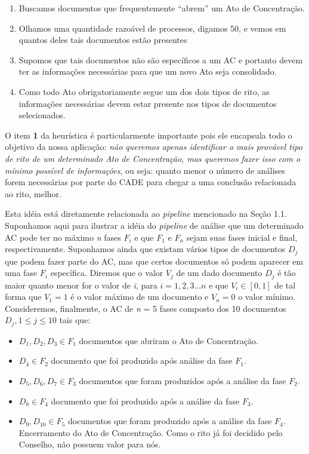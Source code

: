\documentclass[11pt]{report}
\newcommand{\quotes}[1]{``#1''}
\begin{document}
\begin{enumerate}[label=\textbf{\arabic*.}]
\item Buscamos documentos que frequentemente \quotes{abrem} um Ato de Concentração.
\item Olhamos uma quantidade razoável de processos, digamos 50, e vemos em quantos deles tais documentos estão presentes
\item Supomos que tais documentos não são específicos a um AC e portanto devem ter as informações necessárias para que um novo Ato seja consolidado.
\item Como todo Ato obrigatoriamente segue um dos dois tipos de rito, as informações necessárias devem estar presente nos tipos de documentos selecionados.
\end{enumerate}

O item \textbf{1} da heurística é particularmente importante pois ele encapsula todo o objetivo da nossa aplicação: \textit{não queremos apenas identificar o mais provável tipo de rito
de um determinado Ato de Concentração, mas queremos fazer isso com o mínimo possível de informações}, ou seja: quanto menor o número de análises forem
necessárias por parte do CADE para chegar a uma conclusão relacionada ao rito, melhor.

Esta idéia está diretamente relacionada ao \textit{pipeline} mencionado na Seção 1.1. Suponhamos aqui para ilustrar a idéia do
\textit{pipeline} de análise que um determinado AC pode ter no máximo \textit{n} fases $F_i$ e que $F_1$ e $F_n$ sejam suas fases inicial e final, respectivamente.
Suponhamos ainda que existam vários tipos de documentos $D_j$ que podem fazer parte do AC, mas que certos documentos só podem aparecer em uma fase $F_i$ específica.
Diremos que o valor $V_j$ de um dado documento $D_j$ é tão maior quanto menor for o valor de \textit{i}, para $i = 1, 2, 3 ... n$ e que $V_i \in [0, 1]$ de tal
forma que $V_1 = 1$ é o valor máximo de um documento e $V_n = 0$ o valor mínimo.
Consideremos, finalmente, o AC de \textit{n} = 5 fases composto dos 10 documentos $D_j, 1 \leq j \leq 10$ tais que:

\begin{itemize}
  \item $D_1, D_2, D_3 \in F_1$ documentos que abriram o Ato de Concentração.
  \item $D_4 \in F_2$ documento que foi produzido após análise da fase $F_1$.
  \item $D_5, D_6, D_7 \in F_3$ documentos que foram produzidos após a análise da fase $F_2$.
  \item $D_8 \in F_4$ documento que foi produzido após a análise da fase $F_3$.
  \item $D_9, D_{10} \in F_5$ documentos que foram produzido após a análise da fase $F_4$. Encerramento do Ato de Concentração. Como o rito já foi decidido pelo Conselho,
  não possuem valor para nós.
\end{itemize}
\end{document}
